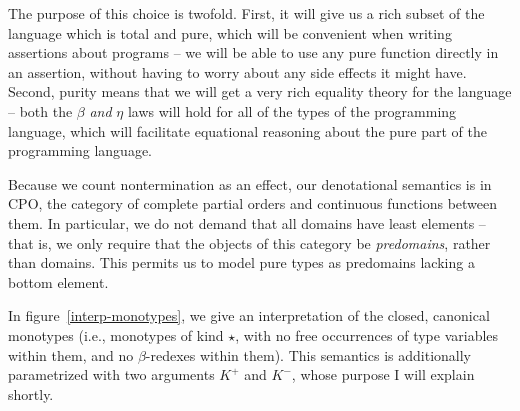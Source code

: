 The purpose of this choice is twofold. First, it will give us a rich
subset of the language which is total and pure, which will be convenient
when writing assertions about programs -- we will be able to use any pure 
function directly in an assertion, without having to worry about any 
side effects it might have. Second, purity means that we will get a 
very rich equality theory for the language -- both the $\beta$ \emph{and}
$\eta$ laws will hold for all of the types of the programming language,
which will facilitate equational reasoning about the pure part of the 
programming language. 

Because we count nontermination as an effect, our denotational
semantics is in CPO, the category of complete partial orders and
continuous functions between them. In particular, we do not demand
that all domains have least elements -- that is, we only require that
the objects of this category be \emph{predomains}, rather than
domains. This permits us to model pure types as predomains lacking a
bottom element.

In figure~\ref{interp-monotypes}, we give an interpretation of the
closed, canonical monotypes (i.e., monotypes of kind $\star$, with no
free occurrences of type variables within them, and no $\beta$-redexes
within them).  This semantics is additionally parametrized with two
arguments $K^+$ and $K^-$, whose purpose I will explain shortly.

